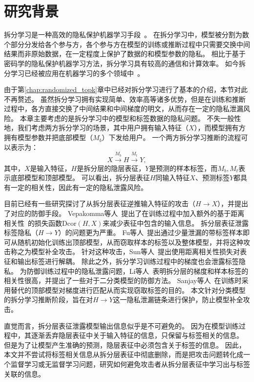 \section{研究背景}
拆分学习是一种高效的隐私保护机器学习手段~\cite{vepakomma2018split,poirot2019split}。
在拆分学习中，模型被分割为数个部分分发给各个参与方，各个参与方在模型的训练或推断过程中只需要交换中间结果而非原始数据，在一定程度上保护了数据的和模型参数的隐私。
%
相比于基于密码学的隐私保护机器学习方法，拆分学习具有较高的通信和计算效率。
%
如今拆分学习已经被应用在机器学习的多个领域中~\cite{palanisamy2021spliteasy,fagbohungbe2022split_edge_image,ccc2022vfgnn}。

由于第\ref{chap:randomized_topk}章中已经对拆分学习进行了基本的介绍，本节对此不再赘述。
%
虽然拆分学习拥有实现简单、效率高等诸多优势，但是在训练和推断过程中，各方直接交换了中间结果和中间梯度的明文，从而存在一定的隐私泄漏风险。
%
本章主要考虑的是拆分学习中的模型和标签数据的隐私问题。
%
不失一般性地，我们考虑两方拆分学习的场景，其中用户拥有输入特征（$X$），而模型拥有方拥有模型参数并把底部模型（$M_b$）下发给用户。
一个两方拆分学习推断的流程可以表示为：
\begin{equation}
    X \stackrel{M_b}{\to} H \stackrel{M_t}{\to} Y,
\end{equation}
其中，$X$是输入特征，$H$是拆分层的隐层表征，$Y$是预测的样本标签，而$M_b, M_t$表示底部模型和顶部模型。
%
可以看出，拆分层表征$H$同输入特征$X$、预测标签$Y$都具有一定的相关性，因此有一定的隐私泄露风险。


目前已经有一些研究探讨了从拆分层表征逆推输入特征的攻击（$H\to X$），并提出了对应的防御手段。
Vepakomma等人~\cite{vepakomma2020nopeek}提出了在训练过程中加入额外的基于距离相关性~\cite{szekely2007dcor}的损失函数$\text{Dcor}(H, X)$来减少表征中包含的输入信息。
%
拆分层表征泄露标签隐私（$H \to Y$）的问题更为严重。
%
Fu等人~\cite{fucong2022label_infer_attack}提出通过少量泄漏的带标签样本即可从随机初始化训练出顶部模型，从而窃取样本的标签以及整体模型，并将这种攻击称之为模型补全攻击。
%
针对这种攻击，Sun等人~\cite{sunjiankai2022forward_embedding_protect}提出使用距离相关性损失对表征和输出标签进行解耦。
%
除此之外，拆分学习训练过程中的梯度也会泄露标签隐私。
为防御训练过程中的隐私泄露问题，Li等人~\cite{oscarli2022label_defense_marvell}表明拆分层的梯度和样本标签的相关性很高，并提出了一些对于二分类模型的防御方法。
Sanjay等人~\cite{sanjay2023exploit_split_learning}在训练时采用替代的顶部模型对梯度进行匹配从而实现窃取标签的目的。
%
本文针对分类模型的拆分学习推断阶段，旨在对$H\to Y$这一隐私泄漏链条进行保护，防止模型补全攻击。

直觉而言，拆分层表征泄露模型输出信息似乎是不可避免的。
%
因为在模型训练过程中，其逐渐丢弃隐层表征中关于输入特征的信息，只保留与标签相关的信息。
但是为了让模型产生准确的预测，隐层表征中必须包含关于标签的信息。
%
因此，本文并不尝试将标签相关信息从拆分层表征中彻底删除，而是把攻击问题转化成一个监督学习或无监督学习问题，研究如何避免攻击者从拆分层表征中学习出与标签关联的信息。
%
